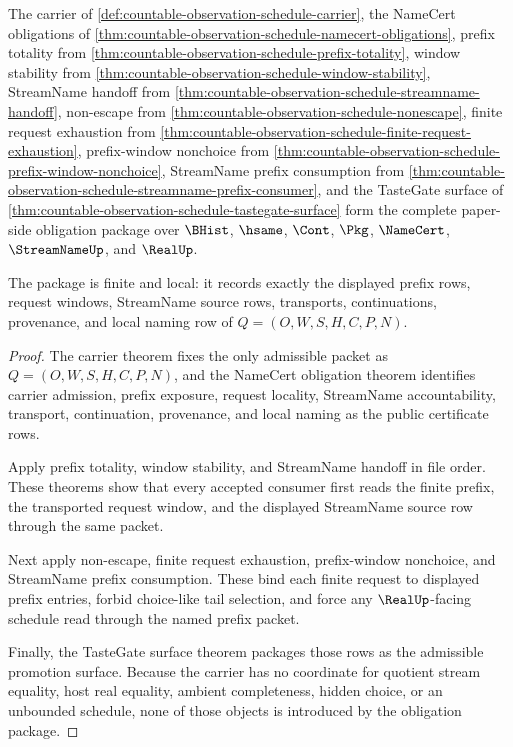 \begin{theorem}
\label{thm:countable-observation-schedule-obligation-closure-package}
The carrier of \autoref{def:countable-observation-schedule-carrier}, the NameCert obligations of \autoref{thm:countable-observation-schedule-namecert-obligations}, prefix totality from \autoref{thm:countable-observation-schedule-prefix-totality}, window stability from \autoref{thm:countable-observation-schedule-window-stability}, StreamName handoff from \autoref{thm:countable-observation-schedule-streamname-handoff}, non-escape from \autoref{thm:countable-observation-schedule-nonescape}, finite request exhaustion from \autoref{thm:countable-observation-schedule-finite-request-exhaustion}, prefix-window nonchoice from \autoref{thm:countable-observation-schedule-prefix-window-nonchoice}, StreamName prefix consumption from \autoref{thm:countable-observation-schedule-streamname-prefix-consumer}, and the TasteGate surface of \autoref{thm:countable-observation-schedule-tastegate-surface} form the complete paper-side obligation package over $\BHist$, $\hsame$, $\Cont$, $\Pkg$, $\NameCert$, $\StreamNameUp$, and $\RealUp$.

The package is finite and local: it records exactly the displayed prefix rows, request windows, StreamName source rows, transports, continuations, provenance, and local naming row of $Q=(O,W,S,H,C,P,N)$.
\end{theorem}
\begin{proof}
The carrier theorem fixes the only admissible packet as $Q=(O,W,S,H,C,P,N)$, and the NameCert obligation theorem identifies carrier admission, prefix exposure, request locality, StreamName accountability, transport, continuation, provenance, and local naming as the public certificate rows.

Apply prefix totality, window stability, and StreamName handoff in file order. These theorems show that every accepted consumer first reads the finite prefix, the transported request window, and the displayed StreamName source row through the same packet.

Next apply non-escape, finite request exhaustion, prefix-window nonchoice, and StreamName prefix consumption. These bind each finite request to displayed prefix entries, forbid choice-like tail selection, and force any $\RealUp$-facing schedule read through the named prefix packet.

Finally, the TasteGate surface theorem packages those rows as the admissible promotion surface. Because the carrier has no coordinate for quotient stream equality, host real equality, ambient completeness, hidden choice, or an unbounded schedule, none of those objects is introduced by the obligation package.
\end{proof}

